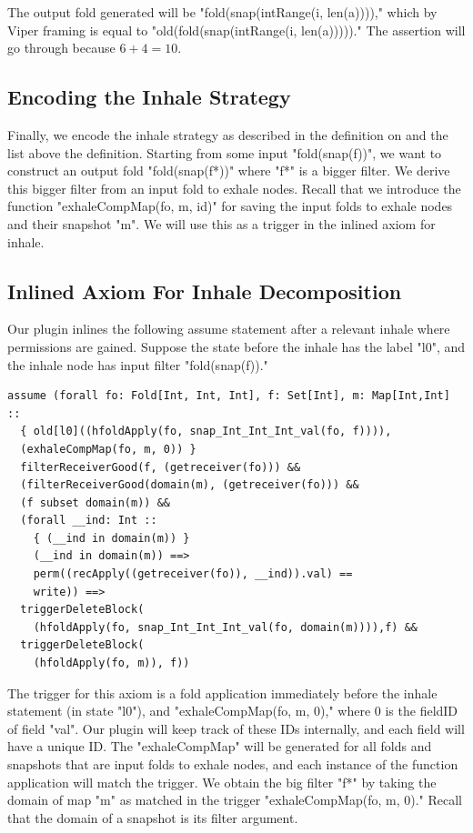 \documentclass[msc,oneside]{ubcthesis}
\theoremstyle{definition}
\begin{document}
The output fold generated will be "fold(snap(intRange(i, len(a))))," which by Viper framing is equal to "old(fold(snap(intRange(i, len(a)))))." The assertion will go through because $6 + 4 = 10$.

\subsection{Encoding the Inhale Strategy }
Finally, we encode the inhale strategy as described in the definition on  and the list above the definition.  Starting from some input "fold(snap(f))", we want to construct an output fold "fold(snap(f*))" where "f*" is a bigger filter. We derive this bigger filter from an input fold to exhale nodes. Recall that we introduce the function "exhaleCompMap(fo, m, id)" for saving the input folds to exhale nodes and their snapshot "m". We will use this as a trigger in the inlined axiom for inhale.

\subsection{Inlined Axiom For Inhale Decomposition}
Our plugin inlines the following assume statement after a relevant inhale where permissions are gained. Suppose the state before the inhale has the label "l0", and the inhale node has input filter "fold(snap(f))."
\begin{lstlisting}
assume (forall fo: Fold[Int, Int, Int], f: Set[Int], m: Map[Int,Int] ::
  { old[l0]((hfoldApply(fo, snap_Int_Int_Int_val(fo, f)))),
  (exhaleCompMap(fo, m, 0)) }
  filterReceiverGood(f, (getreceiver(fo))) &&
  (filterReceiverGood(domain(m), (getreceiver(fo))) &&
  (f subset domain(m)) &&
  (forall __ind: Int ::
    { (__ind in domain(m)) }
    (__ind in domain(m)) ==>
    perm((recApply((getreceiver(fo)), __ind)).val) ==
    write)) ==>
  triggerDeleteBlock(
    (hfoldApply(fo, snap_Int_Int_Int_val(fo, domain(m)))),f) &&
  triggerDeleteBlock(
    (hfoldApply(fo, m)), f))
\end{lstlisting}
The trigger for this axiom is a fold application immediately before the inhale statement (in state "l0"), and "exhaleCompMap(fo, m, 0)," where 0 is the fieldID of field "val". Our plugin will keep track of these IDs internally, and each field will have a unique ID.  The "exhaleCompMap" will be generated for all folds and snapshots that are input folds to exhale nodes, and each instance of the function application will match the trigger. We obtain the big filter "f*" by taking the domain of map "m" as matched in the trigger "exhaleCompMap(fo, m, 0)." Recall that the domain of a snapshot is its filter argument.
\end{document}
